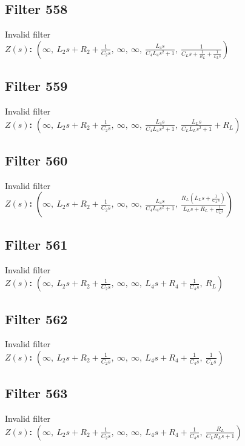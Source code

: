 \documentclass{article}
\begin{document}
\subsection*{Filter 558}
Invalid filter \\ 
\textbf{$Z(s)$:} $\left( \infty, \  L_{2} s + R_{2} + \frac{1}{C_{2} s}, \  \infty, \  \infty, \  \frac{L_{4} s}{C_{4} L_{4} s^{2} + 1}, \  \frac{1}{C_{L} s + \frac{1}{R_{L}} + \frac{1}{L_{L} s}}\right)$ \\ 
\subsection*{Filter 559}
Invalid filter \\ 
\textbf{$Z(s)$:} $\left( \infty, \  L_{2} s + R_{2} + \frac{1}{C_{2} s}, \  \infty, \  \infty, \  \frac{L_{4} s}{C_{4} L_{4} s^{2} + 1}, \  \frac{L_{L} s}{C_{L} L_{L} s^{2} + 1} + R_{L}\right)$ \\ 
\subsection*{Filter 560}
Invalid filter \\ 
\textbf{$Z(s)$:} $\left( \infty, \  L_{2} s + R_{2} + \frac{1}{C_{2} s}, \  \infty, \  \infty, \  \frac{L_{4} s}{C_{4} L_{4} s^{2} + 1}, \  \frac{R_{L} \left(L_{L} s + \frac{1}{C_{L} s}\right)}{L_{L} s + R_{L} + \frac{1}{C_{L} s}}\right)$ \\ 
\subsection*{Filter 561}
Invalid filter \\ 
\textbf{$Z(s)$:} $\left( \infty, \  L_{2} s + R_{2} + \frac{1}{C_{2} s}, \  \infty, \  \infty, \  L_{4} s + R_{4} + \frac{1}{C_{4} s}, \  R_{L}\right)$ \\ 
\subsection*{Filter 562}
Invalid filter \\ 
\textbf{$Z(s)$:} $\left( \infty, \  L_{2} s + R_{2} + \frac{1}{C_{2} s}, \  \infty, \  \infty, \  L_{4} s + R_{4} + \frac{1}{C_{4} s}, \  \frac{1}{C_{L} s}\right)$ \\ 
\subsection*{Filter 563}
Invalid filter \\ 
\textbf{$Z(s)$:} $\left( \infty, \  L_{2} s + R_{2} + \frac{1}{C_{2} s}, \  \infty, \  \infty, \  L_{4} s + R_{4} + \frac{1}{C_{4} s}, \  \frac{R_{L}}{C_{L} R_{L} s + 1}\right)$ \\ 
\end{document}
